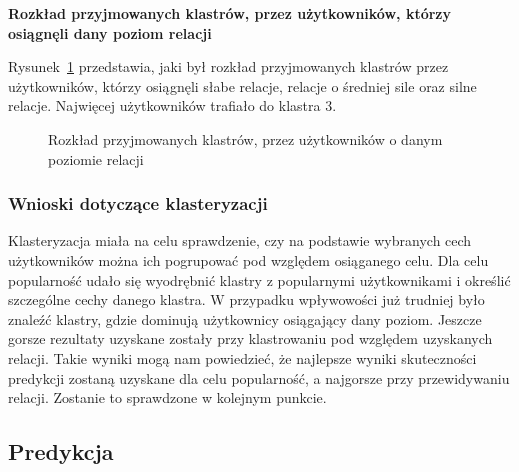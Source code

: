 \documentclass[polish,12pt]{aghthesis}
\begin{document}
\textbf{Rozkład przyjmowanych klastrów, przez użytkowników, którzy osiągnęli dany poziom relacji}

\vspace{5mm}
 
 Rysunek~\ref{pie:r} przedstawia, jaki był rozkład przyjmowanych klastrów przez użytkowników, którzy osiągnęli słabe relacje, relacje o średniej sile oraz silne relacje. Najwięcej użytkowników trafiało do klastra 3.
 
   \begin{figure}

\begin{minipage}{.5\linewidth}
\centering
{}
\end{minipage}%
\begin{minipage}{.5\linewidth}
\centering
{}
\end{minipage}\par\medskip
\centering
{}

\caption{Rozkład przyjmowanych klastrów, przez użytkowników o danym poziomie relacji}
\label{pie:r}
\end{figure}
 

\FloatBarrier

\subsubsection{Wnioski dotyczące klasteryzacji}

Klasteryzacja miała na celu sprawdzenie, czy na podstawie wybranych cech użytkowników można ich pogrupować pod względem osiąganego celu. Dla celu popularność udało się wyodrębnić klastry z popularnymi użytkownikami i określić szczególne cechy danego klastra. W przypadku wpływowości już trudniej było znaleźć klastry, gdzie dominują użytkownicy osiągający dany poziom. Jeszcze gorsze rezultaty uzyskane zostały przy klastrowaniu pod względem uzyskanych relacji. Takie wyniki mogą nam powiedzieć, że najlepsze wyniki skuteczności predykcji zostaną uzyskane dla celu popularność, a najgorsze przy przewidywaniu relacji. Zostanie to sprawdzone w kolejnym punkcie. 

\subsection{Predykcja}
\end{document}
